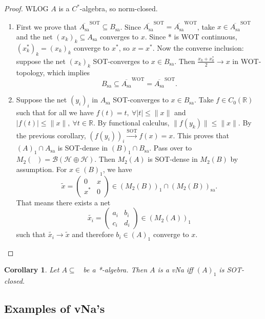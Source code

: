 \documentclass[10pt, a4paper]{article}
\newtheorem{corollary}[thm]{Corollary}
\newenvironment{noticeC}{%
  \tcolorbox[%
  notitle,
  empty,
  enhanced,  %
  breakable,
  coltext=black, 
  fontupper=\rmfamily,
  noparskip,
  sharp corners,
  boxrule=-1pt,  %
  frame hidden,
  left=7pt,  %
  right=7pt,
  top=5pt,
  bottom=5pt,
  before skip=2.5ex plus 2pt,
  after skip=2.5ex plus 2pt,
  overlay unbroken and last={%
  },
  ]}
{\endtcolorbox}
\newenvironment{myproof}%
  {\begin{noticeC}\begin{proof}}%
  {\end{proof}\end{noticeC}}
\newcommand{\R}{\mathbb {R}}
\DeclareMathOperator{\sa}{sa}
\DeclareMathOperator{\bh}{\mathcal{B} (\mathcal{H})}
\begin{document}
\begin{myproof}
  WLOG $A$ is a $C^*$-algebra, so norm-closed.
  \begin{enumerate}
    \item First we prove that $\overline{A_{\sa}}^{\mathrm{SOT}} \subseteq B_{\sa}$.
    Since $\overline{A_{\sa}}^{\mathrm{SOT}} = \overline{A_{\sa}}^{\mathrm{WOT}}$, take $x \in \overline{A_{\sa}}^{\mathrm{SOT}}$
    and the net $(x_k)_k \subseteq A_{\sa}$ converges to $x$. Since * is WOT continuous, 
    $(x_k ^*)_k = (x_k)_k$ converge to $x^*$, so $x = x^*$.
    Now the converse inclusion: suppose the net $(x_k)_k$ SOT-converges to $x \in B_{\sa}$.
    Then $\frac{x_k + x_k^*}{2} \to x$ in WOT-topology, which implies 
    $$B_{\sa} \subseteq \overline{A_{\sa}}^{\mathrm{WOT}} = \overline{A_{\sa}}^{\mathrm{SOT}}.$$
    \item Suppose the net $(y_i)_i$ in $A_{\sa}$ SOT-converges to $x \in B_{\sa}$.
    Take $f \in C_0 (\R)$ such that for all we have $f(t) = t,\ \forall |t| \leq \|x\|$ and $|f(t)| \leq \|x\|,\ \forall t \in \R$. 
    By functional calculus, $\| f(y_k)\| \leq \|x\|$. By the previous corollary, $(f(y_i))_i \xrightarrow{\mathrm{SOT}} f(x) = x$.
    This proves that $(A)_1 \cap A_{\sa}$ is SOT-dense in $(B)_1 \cap B_{\sa}$.
    Pass over to $M_2 (\bh) = \mathcal{B} (\mathcal{H} \oplus \mathcal{H})$.
    Then $M_2 (A)$ is SOT-dense in $M_2 (B)$ by assumption. For $x \in (B)_1$, we have 
    $$\widetilde{x} = \begin{pmatrix}
      0 & x\\
      x^* & 0
    \end{pmatrix} \in (M_2 (B))_1 \cap (M_2 (B))_{\sa}.$$ 
    That means there exists a net $$\widetilde{x_i} = \begin{pmatrix}
      a_i & b_i\\
      c_i & d_i
    \end{pmatrix} \in (M_2 (A))_1$$ such that $\widetilde{x_i} \to \widetilde{x}$
    and therefore $b_i \in (A)_1$ converge to $x$. \qedhere
  \end{enumerate}
\end{myproof}

\begin{corollary}
  Let $A \subseteq \bh$ be a *-algebra. Then $A$ is a vNa iff $(A)_1$ is SOT-closed.
\end{corollary}

\subsection{Examples of vNa's}
\end{document}
